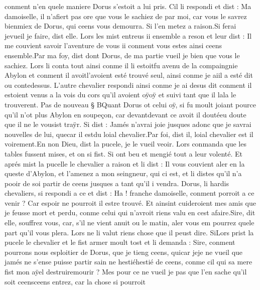 \documentclass{article}
\begin{document}
\begin{pages}
   conment n’en quele maniere Dorus s’estoit a lui pris. 
   Cil li respondi et dist :
   Ma damoiselle, il n’afiert pas ore que vous le sachiez de par moi, car vous le savrez 
      bienmiex de Dorus, qui ceens vous 
      demourra. Si l’en metez a raison.Si ferai jevueil je faire, dist elle. 
   Lors les mist entreus ii ensemble a reson et leur dist :
   Il me couvient savoir l’aventure de vous ii conment vous estes ainsi ceens ensemble.Par ma foy, dist dont Dorus, de ma partie vueil je bien que 
      vous le sachiez.
   Lors li conta tout ainsi conme il li estoitfu 
      avenu de la compaingnie Abylon et conment 
      il avoitl'avoient 
      esté trouvé seul, ainsi conme 
         je aiil a esté dit 
         ou contedessus. 
   L’autre chevalier respondi ainsi conme je ai desus dit 
   conment il estoient venus a la vois du cors qu’il avoient 
      oÿoÿ et suivi tant que il 
      lala le trouverent. \pend
\pstart Pas de nouveau § BQuant Dorus ot celui oÿ, si fu moult joiant pource qu’il n’ot 
   plus Abylon en soupeçon, car devantdevant ce 
   avoit il doutéeu doute que il ne le vousist traÿr. Si dist :
   Jamés n’avrai joie jusques adonc que je savrai nouvelles 
      de lui, quecar il estdu 
      loial chevalier.Par foi, dist il, loial chevalier est il voirement.En non Dieu, dist la pucele, je le vueil veoir.
   Lors conmanda que les tables fussent mises, et on si fist. Si ont beu et mengié tout a leur volenté. 
   Et aprés mist la pucelle 
   le chevalier a raison et li dist :
   Il vous couvient aler en la queste d’Abylon, et l’amenez 
      a mon seingneur, qui ci est, et li distes 
      qu’il n’a pooir de soi partir de ceens jusques a tant qu’il i vendra. \pend
\pstart Dorus, 
   li hardis chevaliers, 
   si respondi a ce et dist :
   Ha ! franche damoiselle, conment porroit a ce venir ? Car espoir ne pourroit il estre trouvé. 
   Et ainsint cuideroient mes amis que je feusse mort et perdu, conme celui qui n’avroit riens valu en cest afaire.Sire, dit elle, souffrez vous, car, s’il ne vient anuit ou le matin, 
      aler vous em pourrez quele part qu’il vous plera.
   Lors ne li valut riens chose que il peust dire. 
   SiLors prist la pucele 
   le chevalier et le fist armer moult tost et li demanda :
   Sire, conment pourrons nous esploitier de Dorus, que je tieng ceens, 
      quicar jeje ne 
      vueil que jamés ne s’ense 
      puisse partir sain ne hestiéhestié de ceens, conme cil qui 
      sa mere fist 
      mon aÿel destruiremourir ? Mes pour ce ne vueil je pas 
      que l’en sache qu’il soit ceensceens entrez, car la chose si pourroit 

\end{pages}
\end{document}
